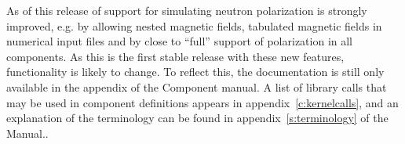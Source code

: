As of this release of \MCS support for simulating neutron
polarization is strongly improved, e.g. by allowing nested magnetic
fields, tabulated magnetic fields in numerical input files and by close
to ``full'' support of polarization in all components. As this is the
first stable release with these new features, functionality is likely to change. To reflect this, the
documentation is still only available in the appendix of the Component manual. %
A list of library calls that may be used in component definitions
appears in appendix~\ref{c:kernelcalls}, and
an explanation of the \MCS terminology can be
found in appendix~\ref{s:terminology} of the Manual..





